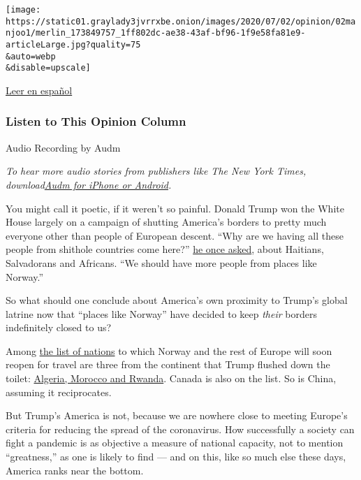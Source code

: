 \texttt{[image: https://static01.graylady3jvrrxbe.onion/images/2020/07/02/opinion/02manjoo1/merlin\_173849757\_1ff802dc-ae38-43af-bf96-1f9e58fa81e9-articleLarge.jpg?quality=75\\\&auto=webp\\\&disable=upscale]}

\href{https://www.nytimes3xbfgragh.onion/es/2020/07/03/espanol/opinion/prohibicion-viajar-europa.html}{Leer
en español}

\hypertarget{listen-to-this-opinion-column}{%
\subsubsection{Listen to This Opinion
Column}\label{listen-to-this-opinion-column}}

Audio Recording by Audm

\emph{To hear more audio stories from publishers like The New York
Times,
download}\href{https://www.audm.com/?utm_source=nytopinion\&utm_medium=embed\&utm_campaign=world_america_out}{\emph{Audm
for iPhone or Android}}\emph{.}

You might call it poetic, if it weren't so painful. Donald Trump won the
White House largely on a campaign of shutting America's borders to
pretty much everyone other than people of European descent. ``Why are we
having all these people from shithole countries come here?''
\href{https://www.washingtonpost.com/politics/trump-attacks-protections-for-immigrants-from-shithole-countries-in-oval-office-meeting/2018/01/11/bfc0725c-f711-11e7-91af-31ac729add94_story.html}{he
once asked}, about Haitians, Salvadorans and Africans. ``We should have
more people from places like Norway.''

So what should one conclude about America's own proximity to Trump's
global latrine now that ``places like Norway'' have decided to keep
\emph{their} borders indefinitely closed to us?

Among
\href{https://www.consilium.europa.eu/en/press/press-releases/2020/06/30/council-agrees-to-start-lifting-travel-restrictions-for-residents-of-some-third-countries/}{the
list of nations} to which Norway and the rest of Europe will soon reopen
for travel are three from the continent that Trump flushed down the
toilet:
\href{https://www.nytimes3xbfgragh.onion/2020/06/30/world/europe/eu-reopening-blocks-us-travelers.html}{Algeria,
Morocco and Rwanda}. Canada is also on the list. So is China, assuming
it reciprocates.

But Trump's America is not, because we are nowhere close to meeting
Europe's criteria for reducing the spread of the coronavirus. How
successfully a society can fight a pandemic is as objective a measure of
national capacity, not to mention ``greatness,'' as one is likely to
find --- and on this, like so much else these days, America ranks near
the bottom.

